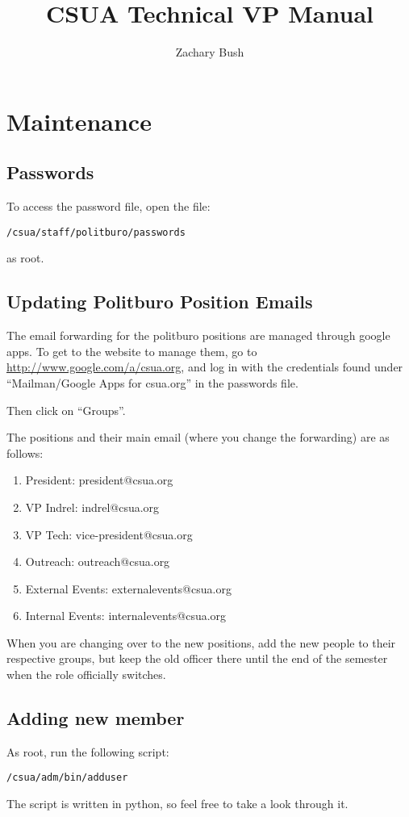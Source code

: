 \documentclass[letterpaper]{book}
\title{CSUA Technical VP Manual}
\author{Zachary Bush}
\begin{document}
\maketitle
\tableofcontents
\chapter{Maintenance}
\section{Passwords}
To access the password file, open the file:
\begin{verbatim}
/csua/staff/politburo/passwords
\end{verbatim}
as root. 

\section{Updating Politburo Position Emails}
The email forwarding for the politburo positions are managed through google
apps. To get to the website to manage them, go to
\url{http://www.google.com/a/csua.org}, and log in with the credentials found
under ``Mailman/Google Apps for csua.org'' in the passwords file.

Then click on ``Groups''. 

The positions and their main email (where you change the forwarding) are as follows:
\begin{enumerate}
\item President: president@csua.org
\item VP Indrel: indrel@csua.org
\item VP Tech: vice-president@csua.org
\item Outreach: outreach@csua.org
\item External Events: externalevents@csua.org
\item Internal Events: internalevents@csua.org
\end{enumerate}

When you are changing over to the new positions, add the new people to their
respective groups, but keep the old officer there until the end of the semester
when the role officially switches.

\section{Adding new member}
As root, run the following script:
\begin{verbatim}
/csua/adm/bin/adduser
\end{verbatim}
The script is written in python, so feel free to take a look through it. 
\end{document}
